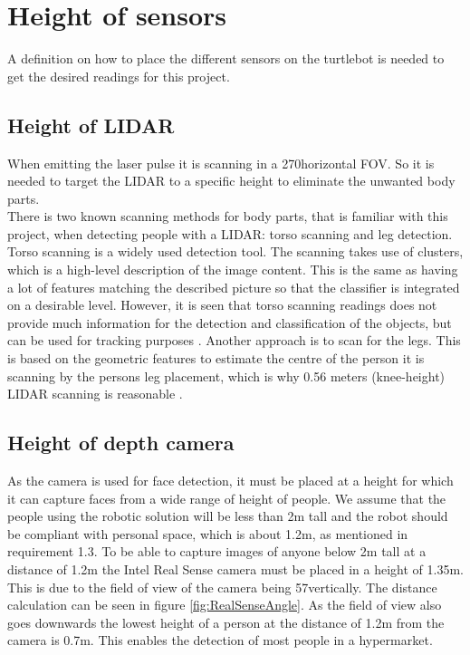 \section{Height of sensors} \label{sec:height}
A definition on how to place the different sensors on the turtlebot is needed to get the desired readings for this project.

\subsection{Height of LIDAR}
When emitting the laser pulse it is scanning in a 270\degree \space horizontal FOV. So it is needed to target the LIDAR to a specific height to eliminate the unwanted body parts.\\
There is two known scanning methods for body parts, that is familiar with this project, when detecting people with a LIDAR: torso scanning and leg detection.
Torso scanning is a widely used detection tool. The scanning takes use of clusters, which is a high-level description of the image content. This is the same as having a lot of features matching the described picture so that the classifier is integrated on a desirable level. However, it is seen that torso scanning readings does not provide much information for the detection and classification of the objects, but can be used for tracking purposes \cite{taipalus2011human}. 
Another approach is to scan for the legs. This is based on the geometric features to estimate the centre of the person it is scanning by the persons leg placement, which is why 0.56 meters (knee-height) LIDAR scanning is reasonable  \cite{taipalus2011human}.

\subsection{Height of depth camera}
As the camera is used for face detection, it must be placed at a height for which it can capture faces from a wide range of height of people. We assume that the people using the robotic solution will be less than 2m tall and the robot should be compliant with personal space, which is about 1.2m, as mentioned in requirement 1.3.
To be able to capture images of anyone below 2m tall at a distance of 1.2m the Intel Real Sense camera must be placed in a height of 1.35m. This is due to the field of view of the camera being 57\degree vertically. The distance calculation can be seen in figure \ref{fig:RealSenseAngle}. As the field of view also goes downwards the lowest height of a person at the distance of 1.2m from the camera is 0.7m. This enables the detection of most people in a hypermarket.

